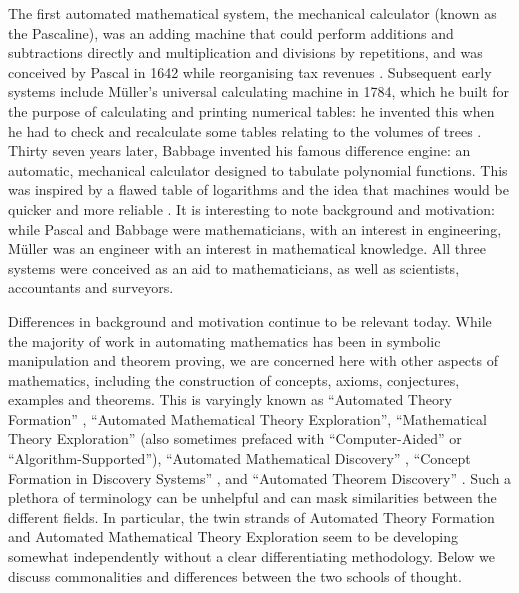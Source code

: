 The first automated mathematical system, the mechanical calculator
(known as the Pascaline), was an adding machine that could perform
additions and subtractions directly and multiplication and divisions
by repetitions, and was conceived by Pascal in 1642 while reorganising
tax revenues \cite{d'ocagne}. Subsequent early systems include
M\"uller's universal calculating machine in 1784, which he built for
the purpose of calculating and printing numerical tables: he invented
this when he had to check and recalculate some tables relating to the
volumes of trees \cite[p. 65]{lindgren}. Thirty seven years later,
Babbage invented his famous difference engine: an automatic,
mechanical calculator designed to tabulate polynomial functions. This
was inspired by a flawed table of logarithms and the idea that
machines would be quicker and more reliable \cite{bowden}. It is
interesting to note background and motivation: while Pascal and
Babbage were mathematicians, with an interest in engineering, M\"uller
was an engineer with an interest in mathematical knowledge. All three
systems were conceived as an aid to mathematicians, as well as
scientists, accountants and surveyors.

Differences in background and motivation continue to be relevant
today. While the majority of work in automating mathematics has been
in symbolic manipulation and theorem proving, we are concerned here
with other aspects of mathematics, including the construction of
concepts, axioms, conjectures, examples and theorems. This is
varyingly known as ``Automated Theory Formation''
\cite{lenat:77,colton:book}, ``Automated Mathematical Theory
Exploration'', ``Mathematical Theory Exploration''
\cite{buchberger:06} (also sometimes prefaced with ``Computer-Aided''
or ``Algorithm-Supported''), ``Automated Mathematical Discovery''
\cite{epstein:91,colton:interestingness,esarm2008}, ``Concept
Formation in Discovery Systems'' \cite{haase}, and ``Automated Theorem
Discovery'' \cite{roy}. Such a plethora of terminology can be
unhelpful and can mask similarities between the different fields. In
particular, the twin strands of Automated Theory Formation and
Automated Mathematical Theory Exploration seem to be developing
somewhat independently without a clear differentiating
methodology. Below we discuss commonalities and differences between
the two schools of thought.



